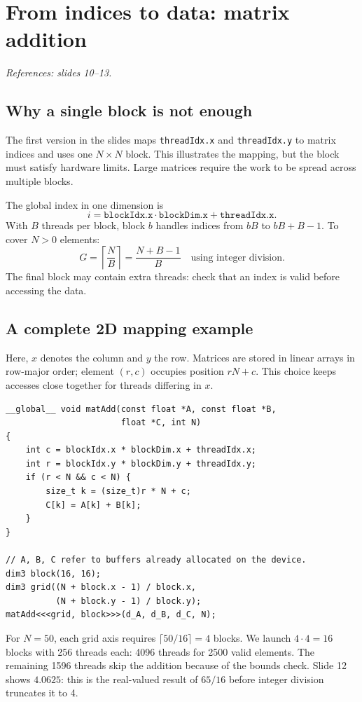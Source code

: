 \documentclass[11pt,a4paper]{article}
\let\originalsection\section
\renewcommand{\section}{\Needspace{7\baselineskip}\originalsection}
\let\originalsubsection\subsection
\renewcommand{\subsection}{\Needspace{5\baselineskip}\originalsubsection}
\newcommand{\src}[1]{\par{\small\color{accent}\textit{References: #1.}}\par}
\begin{document}
\section{From indices to data: matrix addition}
\src{slides 10--13}
\subsection{Why a single block is not enough}
The first version in the slides maps \texttt{threadIdx.x} and
\texttt{threadIdx.y} to matrix indices and uses one $N\times N$ block.
This illustrates the mapping, but the block must satisfy hardware limits.
Large matrices require the work to be spread across multiple blocks.

The global index in one dimension is
\begin{equation}\boxed{i=\texttt{blockIdx.x}\cdot\texttt{blockDim.x}
 +\texttt{threadIdx.x}.}\end{equation}
With $B$ threads per block, block $b$ handles indices from $bB$ to
$bB+B-1$. To cover $N>0$ elements:
\begin{equation}
G=\left\lceil\frac{N}{B}\right\rceil
 =\frac{N+B-1}{B}\quad\text{using integer division}.
\end{equation}
The final block may contain extra threads: check that an index is valid
before accessing the data.

\subsection{A complete 2D mapping example}
Here, $x$ denotes the column and $y$ the row. Matrices are stored in linear
arrays in row-major order; element $(r,c)$ occupies position $rN+c$.
This choice keeps accesses close together for threads differing in $x$.

\begin{lstlisting}
__global__ void matAdd(const float *A, const float *B,
                       float *C, int N)
{
    int c = blockIdx.x * blockDim.x + threadIdx.x;
    int r = blockIdx.y * blockDim.y + threadIdx.y;
    if (r < N && c < N) {
        size_t k = (size_t)r * N + c;
        C[k] = A[k] + B[k];
    }
}

// A, B, C refer to buffers already allocated on the device.
dim3 block(16, 16);
dim3 grid((N + block.x - 1) / block.x,
          (N + block.y - 1) / block.y);
matAdd<<<grid, block>>>(d_A, d_B, d_C, N);
\end{lstlisting}

For $N=50$, each grid axis requires $\lceil50/16\rceil=4$ blocks.
We launch $4\cdot4=16$ blocks with 256 threads each: 4096 threads for
2500 valid elements. The remaining 1596 threads skip the addition because
of the bounds check. Slide 12 shows $4.0625$: this is the real-valued
result of $65/16$ before integer division truncates it to 4.
\end{document}
